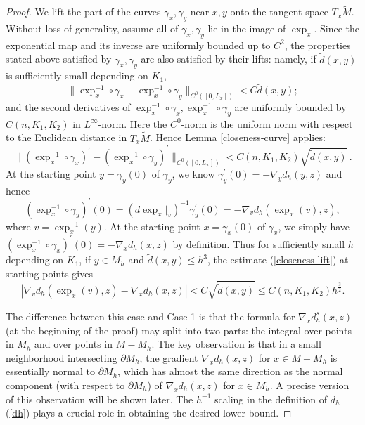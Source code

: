 \documentclass[11pt,letterpaper]{amsart}
\numberwithin{equation}{section}
\theoremstyle{definition}
\theoremstyle{plain}
\theoremstyle{definition}
\theoremstyle{plain}
\theoremstyle{definition}
\theoremstyle{plain}
\begin{document}
\begin{proof}
We lift the part of the curves $\gamma_{x},\gamma_{y}$ near $x,y$ onto the tangent space $T_x \widetilde{M}$. Without loss of generality, assume all of $\gamma_x,\gamma_y$ lie in the image of $\exp_x$. Since the exponential map and its inverse are uniformly bounded up to $C^2$, the properties stated above satisfied by $\gamma_x,\gamma_y$ are also satisfied by their lifts: namely, if $\widetilde{d}(x,y)$ is sufficiently small depending on $K_1$,
$$\|\exp_x^{-1}\circ \gamma_x-\exp_x^{-1}\circ \gamma_y\|_{C^0([0,L_x])}<C\widetilde{d}(x,y);$$
and the second derivatives of $\exp_x^{-1}\circ \gamma_x,\exp_x^{-1}\circ \gamma_y$ are uniformly bounded by $C(n,K_1,K_2)$ in $L^{\infty}$-norm. Here the $C^0$-norm is the uniform norm with respect to the Euclidean distance in $T_x \widetilde{M}$. Hence Lemma \ref{closeness-curve} applies:
\begin{equation}\label{closeness-lift}
\|(\exp_x^{-1}\circ \gamma_x)^{\prime}-(\exp_x^{-1}\circ \gamma_y)^{\prime}\|_{C^0([0,L_x])}<C(n,K_1,K_2)\sqrt{\widetilde{d}(x,y)}\, .
\end{equation}
At the starting point $y=\gamma_y(0)$ of $\gamma_y$, we know $\gamma_y^{\prime}(0)=-\nabla_y d_h(y,z)$ and hence
$$(\exp_x^{-1}\circ \gamma_y)^{\prime}(0)=(d\exp_x |_{v})^{-1} \gamma_y^{\prime}(0)=-\nabla_v d_h(\exp_x(v),z), $$
where $v=\exp_x^{-1}(y)$. At the starting point $x=\gamma_x(0)$ of $\gamma_x$, we simply have $(\exp_x^{-1}\circ \gamma_x)^{\prime}(0)=-\nabla_x d_h(x,z)$ by definition. Thus for sufficiently small $h$ depending on $K_1$, if $y\in M_h$ and $\widetilde{d}(x,y)\leqslant h^3$, the estimate (\ref{closeness-lift}) at starting points gives
\begin{equation}\label{closeness}
|\nabla_v d_h(\exp_x(v),z)-\nabla_x d_h(x,z)| < C\sqrt{\widetilde{d}(x,y)} \leqslant C(n,K_1,K_2)h^{\frac{3}{2}}.
\end{equation}

The difference between this case and Case 1 is that the formula for $\nabla_x d_h^s(x,z)$ (at the beginning of the proof) may split into two parts: the integral over points in $M_h$ and over points in $M-M_h$. The key observation is that in a small neighborhood intersecting $\partial M_h$, the gradient $\nabla_x d_h(x,z)$ for $x\in M-M_h$ is essentially normal to $\partial M_h$, which has almost the same direction as the normal component (with respect to $\partial M_h$) of $\nabla_x d_h(x,z)$ for $x\in M_h$. A precise version of this observation will be shown later. The $h^{-1}$ scaling in the definition of $d_h$ (\ref{dh}) plays a crucial role in obtaining the desired lower bound.


\end{proof}
\end{document}

